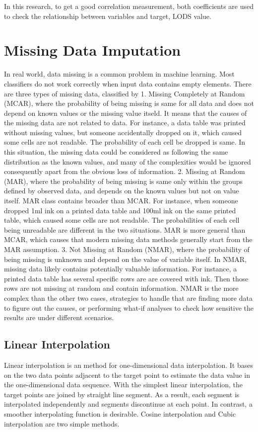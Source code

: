 \documentclass[12pt,a4paper,english
]{tunithesis}
\begin{document}
In this research, to get a good correlation measurement, both coefficients are used to check the relationship between variables and target, LODS value.

\section{Missing Data Imputation}
In real world, data missing is a common problem in machine learning. Most classifiers do not work correctly when input data contains empty elements.
There are three types of missing data, classified by \textcite{rubin1976}
1. Missing Completely at Random (MCAR), where the probability of being missing is same for all data and does not depend on known values or the missing value itseld. It means that the causes of the missing data are not related to data. For instance, a data table was printed without missing values, but someone accidentally dropped on it, which caused some cells are not readable. The probability of each cell be dropped is same. In this situation, the missing data could be considered as following the same distribution as the known values, and many of the complexities would be ignored consequently apart from the obvious loss of information.
2. Missing at Random (MAR), where the probability of being missing is same only within the groups defined by observed data, and depends on the known values but not on value itself. MAR class contains broader than MCAR. For instance, when someone dropped 1ml ink on a printed data table and 100ml ink on the same printed table, which caused some cells are not readable. The probabilities of each cell being unreadable are different in the two situations. MAR is more general than MCAR, which causes that modern missing data methods generally start from the MAR assumption.
3. Not Missing at Random (NMAR), where the probability of being missing is unknown and depend on the value of variable itself. In NMAR, missing data likely contains potentially valuable information. For instance, a printed data table has several specific rows are are covered with ink. Then those rows are not missing at random and contain information. NMAR is the more complex than the other two cases, strategies to handle that are finding more data to figure out the causes, or performing what-if analyses to check how sensitive the results are under different scenarios. \parencite{vanbuuren2018}
\subsection{Linear Interpolation}
Linear interpolation is an method for one-dimensional data interpolation. It bases on the two data points adjacent to the target point to estimate the data value in the one-dimensional data sequence. With the simplest linear interpolation, the target points are joined by straight line segment. As a result, each segment is interpolated independently and segments discontinue at each point. \parencite{huang2021, paul1999}
In contrast, a smoother interpolating function is desirable. Cosine interpolation and Cubic interpolation are two simple methods.
\end{document}

